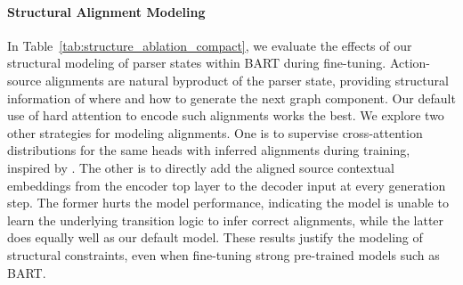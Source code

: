 \begin{table}[!t]
    \centering
     \caption{Ablation study of structure modeling with transition alignments.
    Results are on AMR 2.0 test data.}
    \label{tab:structure_ablation_compact}
\end{table}









\paragraph{Structural Alignment Modeling}

In Table~\ref{tab:structure_ablation_compact}, we evaluate the effects of our structural modeling of parser states within BART during fine-tuning.
 Action-source alignments are natural byproduct of the parser state, providing structural information of where and how to generate the next graph component.
 Our default use of hard attention to encode such alignments works the best.
We explore two other strategies for modeling alignments. One is to supervise cross-attention distributions for the same heads with inferred alignments during training, inspired by \citet{strubell2018linguistically}. The other is to directly add the aligned source contextual embeddings from the encoder top layer to the decoder input at every generation step. The former hurts the model performance, indicating the model is unable to learn the underlying transition logic to infer correct alignments, while the latter does equally well as our default model. These results justify the modeling of structural constraints, even when fine-tuning strong pre-trained models such as BART.
 
